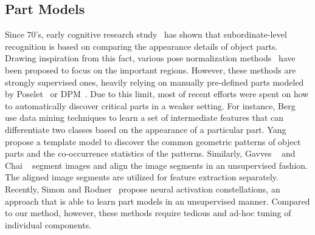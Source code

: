 \documentclass[10pt,twocolumn,letterpaper]{article}
\begin{document}
\subsection{Part Models}
Since 70's, early cognitive research study~\cite{rosch1976basic} has shown that subordinate-level recognition is based on comparing the appearance details of object parts.
Drawing inspiration from this fact, various pose normalization methods~\cite{farrell2011birdlets, zhang2013deformable, zhang2014panda, liu2012dog, zhang2014part} have been proposed to focus on the important regions.
However, these methods are strongly supervised ones, heavily relying on manually pre-defined parts modeled by Poselet~\cite{bourdev2009poselets} or DPM~\cite{felzenszwalb2010object}.
Due to this limit, most of recent efforts were spent on how to automatically discover critical parts in a weaker setting.
For instance, Berg \etal~\cite{berg2013poof} use data mining techniques to learn a set of intermediate features that can differentiate two classes based on the appearance of a particular part.
Yang \etal~\cite{yang2012unsupervised} propose a template model to discover the common geometric patterns of object parts and the co-occurrence statistics of the patterns.
Similarly, Gavves \etal~\cite{gavves2013fine} and Chai \etal~\cite{chai2011bicos} segment images and align the image segments in an unsupervised fashion.
The aligned image segments are utilized for feature extraction separately.
Recently, Simon and Rodner~\cite{simon2015neural} propose neural activation constellations, an approach that is able to learn part models in an unsupervised manner.
Compared to our method, however, these methods require tedious and ad-hoc tuning of individual components.
\end{document}
